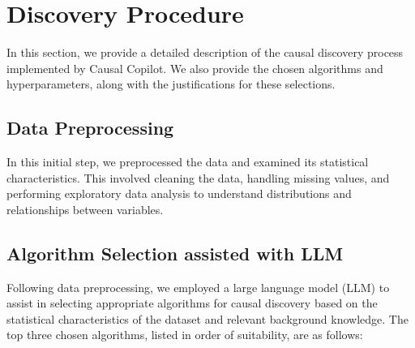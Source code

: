 \documentclass{article}
\begin{document}
\section{Discovery Procedure}

In this section, we provide a detailed description of the causal discovery process implemented by Causal Copilot. 
We also provide the chosen algorithms and hyperparameters, along with the justifications for these selections.

\subsection{Data Preprocessing}
In this initial step, we preprocessed the data and examined its statistical characteristics. 
This involved cleaning the data, handling missing values, and performing exploratory data analysis to understand distributions and relationships between variables.
                
\subsection{Algorithm Selection assisted with LLM}
Following data preprocessing, we employed a large language model (LLM) to assist in 
selecting appropriate algorithms for causal discovery based on the statistical characteristics of the dataset and relevant background knowledge. 
The top three chosen algorithms, listed in order of suitability, are as follows:   
        
\end{document}
